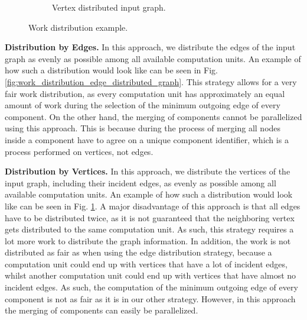 \documentclass[letterpaper]{article}
\newcommand{\mypar}[1]{{\bf #1.}}
\begin{document}
\begin{figure}
\begin{subfigure}{0.33\textwidth}
    \caption{Vertex distributed input graph.}
    \label{fig:work_distribution_vertex_distributed_graph}
  \end{subfigure}
  \caption{Work distribution example.}
  \label{fig:work_distribution}
\end{figure}

\mypar{Distribution by Edges}
In this approach, we distribute the edges of the input graph as evenly as possible among all available computation
units. An example of how such a distribution would look like can be seen in Fig.
\ref{fig:work_distribution_edge_distributed_graph}. This strategy allows for a very fair work distribution, as every
computation unit has approximately an equal amount of work during the selection of the minimum outgoing edge of every
component. On the other hand, the merging of components cannot be parallelized using this approach. This is because
during the process of merging all nodes inside a component have to agree on a unique component identifier, which is a
process performed on vertices, not edges.

\mypar{Distribution by Vertices}
In this approach, we distribute the vertices of the input graph, including their incident edges, as evenly as possible
among all available computation units. An example of how such a distribution would look like can be seen in Fig.
\ref{fig:work_distribution_vertex_distributed_graph}. A major disadvantage of this approach is that all edges have to be
distributed twice, as it is not guaranteed that the neighboring vertex gets distributed to the same computation unit. As
such, this strategy requires a lot more work to distribute the graph information. In addition, the work is not
distributed as fair as when using the edge distribution strategy, because a computation unit could end up with vertices
that have a lot of incident edges, whilst another computation unit could end up with vertices that have almost no
incident edges. As such, the computation of the minimum outgoing edge of every component is not as fair as it is in our
other strategy. However, in this approach the merging of components can easily be parallelized.
\end{document}
